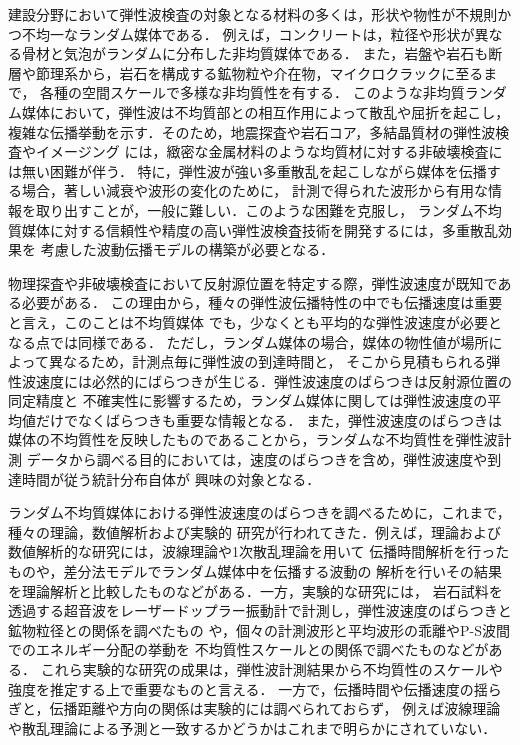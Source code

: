 建設分野において弾性波検査の対象となる材料の多くは，形状や物性が不規則かつ不均一なランダム媒体である．
例えば，コンクリートは，粒径や形状が異なる骨材と気泡がランダムに分布した非均質媒体である．
また，岩盤や岩石も断層や節理系から，岩石を構成する鉱物粒や介在物，マイクロクラックに至るまで，
各種の空間スケールで多様な非均質性を有する\cite{RockPhys}．
このような非均質ランダム媒体において，弾性波は不均質部との相互作用によって散乱や屈折を起こし，
複雑な伝播挙動を示す．そのため，地震探査や岩石コア，多結晶質材の弾性波検査やイメージング
には，緻密な金属材料のような均質材に対する非破壊検査には無い困難が伴う\cite{Sato,Borcea,Thompson}．
特に，弾性波が強い多重散乱を起こしながら媒体を伝播する場合，著しい減衰や波形の変化のために，
計測で得られた波形から有用な情報を取り出すことが，一般に難しい．このような困難を克服し，
ランダム不均質媒体に対する信頼性や精度の高い弾性波検査技術を開発するには，多重散乱効果を
考慮した波動伝播モデルの構築が必要となる．

物理探査や非破壊検査において反射源位置を特定する際，弾性波速度が既知である必要がある\cite{Etgen, Schmitz}．
この理由から，種々の弾性波伝播特性の中でも伝播速度は重要と言え，このことは不均質媒体
でも，少なくとも平均的な弾性波速度が必要となる点では同様である\cite{Langenberg, Bleistein}．
ただし，ランダム媒体の場合，媒体の物性値が場所によって異なるため，計測点毎に弾性波の到達時間と，
そこから見積もられる弾性波速度には必然的にばらつきが生じる．弾性波速度のばらつきは反射源位置の同定精度と
不確実性に影響するため，ランダム媒体に関しては弾性波速度の平均値だけでなくばらつきも重要な情報となる．
また，弾性波速度のばらつきは媒体の不均質性を反映したものであることから，ランダムな不均質性を弾性波計測
データから調べる目的においては，速度のばらつきを含め，弾性波速度や到達時間が従う統計分布自体が
興味の対象となる\cite{Yu,Li}．

ランダム不均質媒体における弾性波速度のばらつきを調べるために，これまで，種々の理論，数値解析および実験的
研究が行われてきた\cite{NishizawaI}．例えば，理論および数値解析的な研究には，波線理論や1次散乱理論を用いて
伝播時間解析を行ったもの\cite{Muller, Korn, Spetzler2001}や，差分法モデルでランダム媒体中を伝播する波動の
解析を行いその結果を理論解析と比較したもの\cite{Spetzler}などがある．一方，実験的な研究には，
岩石試料を透過する超音波をレーザードップラー振動計で計測し，弾性波速度のばらつきと鉱物粒径との関係を調べたもの
\cite{Nishizawa1996,Nishizawa2001}や，個々の計測波形と平均波形の乖離やP-S波間でのエネルギー分配の挙動を
不均質性スケールとの関係で調べたものなど\cite{Sivaji,Fukushima}がある．
これら実験的な研究の成果は，弾性波計測結果から不均質性のスケールや強度を推定する上で重要なものと言える．
一方で，伝播時間や伝播速度の揺らぎと，伝播距離や方向の関係は実験的には調べられておらず，
例えば波線理論や散乱理論による予測と一致するかどうかはこれまで明らかにされていない．

